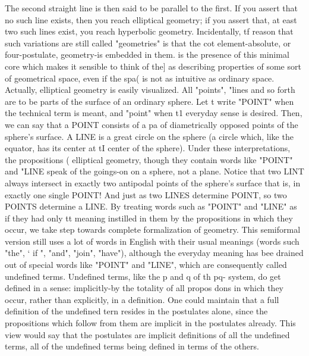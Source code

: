 The second straight line is then said to be parallel to the first. If you assert that no such line exists, then you reach elliptical geometry; if you assert that, at east two such lines exist, you reach hyperbolic geometry. Incidentally, tf reason that such variations are still called "geometries" is that the cot element-absolute, or four-postulate, geometry-is embedded in them. is the presence of this minimal core which makes it sensible to think of the] as describing properties of some sort of geometrical space, even if the spa( is not as intuitive as ordinary space. Actually, elliptical geometry is easily visualized. All "points", "lines and so forth are to be parts of the surface of an ordinary sphere. Let t write "POINT" when the technical term is meant, and "point" when t1 everyday sense is desired. Then, we can say that a POINT consists of a pa of diametrically opposed points of the sphere's surface. A LINE is a great circle on the sphere (a circle which, like the equator, has its center at tI center of the sphere). Under these interpretations, the propositions ( elliptical geometry, though they contain words like "POINT" and "LINE speak of the goings-on on a sphere, not a plane. Notice that two LINT always intersect in exactly two antipodal points of the sphere's surface that is, in exactly one single POINT! And just as two LINES determine POINT, so two POINTS determine a LINE. By treating words such as "POINT" and "LINE" as if they had only tt meaning instilled in them by the propositions in which they occur, we take step towards complete formalization of geometry. This semiformal version still uses a lot of words in English with their usual meanings (words such "the", ` if ", "and", "join", "have"), although the everyday meaning has bee drained out of special words like "POINT" and "LINE", which are consequently called undefined terms. Undefined terms, like the p and q of th pq- system, do get defined in a sense: implicitly-by the totality of all propos dons in which they occur, rather than explicitly, in a definition. One could maintain that a full definition of the undefined tern resides in the postulates alone, since the propositions which follow from them are implicit in the postulates already. This view would say that the postulates are implicit definitions of all the undefined terms, all of the undefined terms being defined in terms of the others. 







